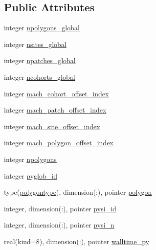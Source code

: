 \subsection*{Public Attributes}
\begin{DoxyCompactItemize}
\item 
integer \hyperlink{structed__state__vars_1_1edtype_a2c9a6eb0f55ef25763cf967357195ca2}{npolygons\+\_\+global}
\item 
integer \hyperlink{structed__state__vars_1_1edtype_ada7b964660b48ec6ff1927bac0a01cd8}{nsites\+\_\+global}
\item 
integer \hyperlink{structed__state__vars_1_1edtype_a95115e0bd4e31a2349c5e225a52bcc49}{npatches\+\_\+global}
\item 
integer \hyperlink{structed__state__vars_1_1edtype_a3218809e78c5790be2aa3832b803b10c}{ncohorts\+\_\+global}
\item 
integer \hyperlink{structed__state__vars_1_1edtype_aaaf033dcc09ae1494f79c4872c6f6b85}{mach\+\_\+cohort\+\_\+offset\+\_\+index}
\item 
integer \hyperlink{structed__state__vars_1_1edtype_a5f04b25303ad67acc6b8f55bff6a2b9f}{mach\+\_\+patch\+\_\+offset\+\_\+index}
\item 
integer \hyperlink{structed__state__vars_1_1edtype_aeb238f3203ef1ea2aeb8fa1281c534a2}{mach\+\_\+site\+\_\+offset\+\_\+index}
\item 
integer \hyperlink{structed__state__vars_1_1edtype_a4ea7cd200dcb086603b0dff1e166a841}{mach\+\_\+polygon\+\_\+offset\+\_\+index}
\item 
integer \hyperlink{structed__state__vars_1_1edtype_a8f64fc796269777fbbea1b14a869d04b}{npolygons}
\item 
integer \hyperlink{structed__state__vars_1_1edtype_aaa7ca99e178071659c352d9e2a64720f}{pyglob\+\_\+id}
\item 
type(\hyperlink{structed__state__vars_1_1polygontype}{polygontype}), dimension(\+:), pointer \hyperlink{structed__state__vars_1_1edtype_aab7d7e9976945b889d2c3e027c6c4451}{polygon}
\item 
integer, dimension(\+:), pointer \hyperlink{structed__state__vars_1_1edtype_a856ffa320fb106490bec6f6664ebb881}{pysi\+\_\+id}
\item 
integer, dimension(\+:), pointer \hyperlink{structed__state__vars_1_1edtype_a2edd5f07c84dea74d1677b4ed8021e99}{pysi\+\_\+n}
\item 
real(kind=8), dimension(\+:), pointer \hyperlink{structed__state__vars_1_1edtype_aabf3fdc1e814dd0f13cff71311dc6ae5}{walltime\+\_\+py}

\end{DoxyCompactItemize}
